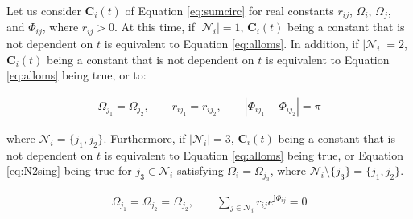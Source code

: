 \documentclass[graybox, envcountchap]{svmult}
\begin{document}
\begin{lemma}
\label{lem:sumc2}

Let us consider $\bm{C}_i (t)$ of Equation \ref{eq:sumcirc} for real constants $r_{ij}$, $\Omega_i$, $\Omega_j$, and $\Phi_{ij}$, where $r_{ij}>0$.
At this time, if $|\mathcal{N}_i|=1$, $\bm{C}_i (t)$ being a constant that is not dependent on $t$ is equivalent to Equation \ref{eq:alloms}.
In addition, if $|\mathcal{N}_i|=2$, $\bm{C}_i (t)$ being a constant that is not dependent on $t$ is equivalent to Equation \ref{eq:alloms} being true, or to:

\begin{align}\label{eq:N2sing}
\Omega_{j_1} = \Omega_{j_2}
,\qquad
r_{i j_1} = r_{i j_2}
,\qquad
|\Phi_{i j_1}-\Phi_{i j_2}| = \pi
\end{align}

where $\mathcal{N}_i = \{j_1,j_2\}$.
Furthermore, if $|\mathcal{N}_i|=3$, $\bm{C}_i (t)$ being a constant that is not dependent on $t$ is equivalent to Equation \ref{eq:alloms} being true,
or Equation \ref{eq:N2sing} being true for $j_3 \in \mathcal{N}_i$ satisfying $\Omega_{i} = \Omega_{j_3}$, where $ \mathcal{N}_i \setminus \{j_3\}=\{j_1,j_2\}$.

\begin{align}\label{eq:threeoms}
\Omega_{j_1} = \Omega_{j_2}= \Omega_{j_2}
,\qquad 
\sum_{j\in \mathcal{N}_i} 
r_{ij} e^{\bm{j} \Phi_{ij}}=0
\end{align}
\end{lemma}
\end{document}

